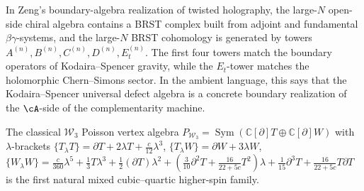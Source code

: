 \begin{example}
\label{ex:kodaira-spencer-defect-algebra}
In Zeng's boundary-algebra realization of twisted holography, the
large-$N$ open-side chiral algebra contains a BRST complex built
from adjoint and fundamental $\beta\gamma$-systems, and the
large-$N$ BRST cohomology is generated by towers
$A^{(n)}, B^{(n)}, C^{(n)}, D^{(n)}, E_t^{(n)}$.
The first four towers match the boundary operators of
Kodaira--Spencer gravity, while the $E_t$-tower matches the
holomorphic Chern--Simons sector. In the ambient language, this
says that the Kodaira--Spencer universal defect algebra is a
concrete boundary realization of the $\cA$-side of the
complementarity machine.
\end{example}

\begin{example}
\label{ex:w3-first-mixed-higher-spin}
The classical $\mathcal{W}_3$ Poisson vertex algebra
$P_{\mathcal{W}_3} = \operatorname{Sym}(\mathbb{C}[\partial]T
\oplus \mathbb{C}[\partial]W)$ with $\lambda$-brackets
$\{T_\lambda T\} = \partial T + 2\lambda T
+ \frac{c}{12}\lambda^3$,
$\{T_\lambda W\} = \partial W + 3\lambda W$,
$\{W_\lambda W\} = \frac{c}{360}\lambda^5 + \frac13 T\lambda^3
+ \frac12(\partial T)\lambda^2
+ (\frac{3}{10}\partial^2 T + \frac{16}{22+5c}T^2)\lambda
+ \frac{1}{15}\partial^3 T + \frac{16}{22+5c}T\partial T$
is the first natural mixed cubic--quartic higher-spin family.
\end{example}

